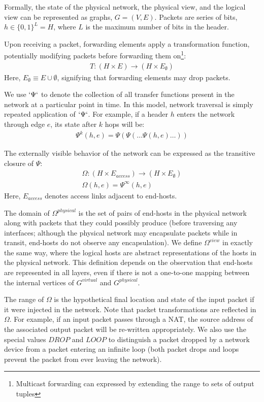 Formally, the state of the physical network, the physical view, and the
logical view can be represented as graphs,
$G = (V, E)$. Packets are series of bits, $h \in \{0,1\}^L = H$,
where $L$ is the maximum number of bits in the header.

Upon receiving a packet,
forwarding elements apply a transformation function, potentially modifying
packets before forwarding them on\footnote{Multicast forwarding can expressed
by extending the range to sets of output tuples}:
\begin{align*}
T: (H \times E) \rightarrow (H \times E_{\emptyset})
\end{align*}
Here, $E_{\emptyset} \equiv E \cup \emptyset$, signifying that forwarding elements
may drop packets.

We use $`\Psi`$ to denote the collection of all transfer functions present in
the network at a particular point in time. In this model, network traversal is
simply repeated application of $`\Psi`$.
For example, if a header $h$ enters the network through edge
$e$, its state after $k$ hops will be:
\begin{align*}
\Psi^k(h,e) = \Psi(\Psi(\dots \Psi(h,e)\dots))
\end{align*}

The externally visible behavior of the network can be expressed as the
transitive closure of $\Psi$:
\begin{align*}
\Omega: (H \times E_{access}) \rightarrow (H \times E_{\emptyset}) \\
\Omega(h,e) = \Psi^{\infty}(h,e)
\end{align*}
Here, $E_{access}$ denotes access links adjacent to end-hosts.

The domain of $\Omega^{physical}$ is the set of pairs of end-hosts in the
physical network along with packets that they could possibly produce (before
traversing any interfaces; although the physical network may encapsulate
packets while in transit, end-hosts do not observe any encapsulation).
We define $\Omega^{view}$ in exactly the same way, where
the logical hosts are abstract representations of the hosts in the physical
network. This definition depends on the observation that end-hosts are represented
in all layers, even if there is not a one-to-one mapping between the
internal vertices of $G^{virtual}$ and $G^{physical}$.

The range of $\Omega$ is the hypothetical final location and state of the
input packet if it were injected in the network.
Note that packet transformations are reflected in
$\Omega$. For example, if an input packet passes through a NAT,
the source address of the associated output packet will be re-written
appropriately. We also use the special values $DROP$ and $LOOP$ to distinguish
a packet dropped by a network device from a packet entering an
infinite loop (both packet drops and loops prevent the packet from ever leaving the network).

